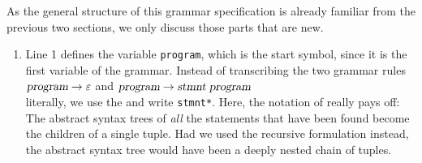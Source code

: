 \noindent
As the general structure of this grammar specification is already familiar from the previous two sections,
we only discuss those parts that are new.
\begin{enumerate}
\item Line 1 defines the variable \texttt{program}, which is the start symbol, since it is the first variable
      of the grammar.  Instead of transcribing the two grammar rules
      \\[0.2cm]
      \hspace*{1.3cm}
      $\textsl{program} \rightarrow \varepsilon$
      \quad and \quad
      $\textsl{program} \rightarrow \textsl{stmnt}\;\textsl{program}$
      \\[0.2cm]
      literally, we use the  and write \texttt{stmnt*}.  Here, the
       notation of  really pays off:  The abstract syntax trees of
      \emph{all} the statements that have been found become the children of a single tuple.  Had we used the
      recursive formulation instead, the abstract syntax tree would have been a deeply nested chain of tuples.


\end{enumerate}
